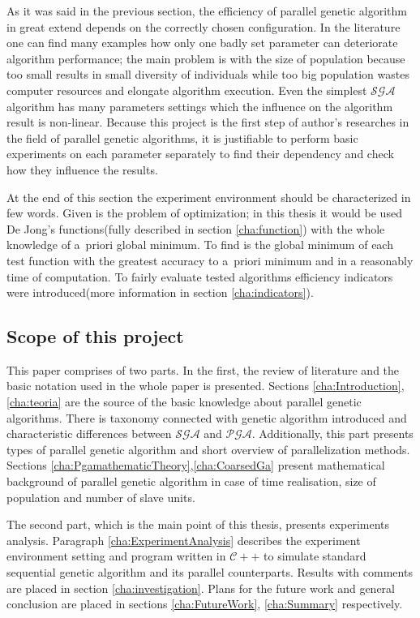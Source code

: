 As it was said in the previous section, the efficiency of parallel genetic
algorithm in great extend depends on the correctly chosen configuration. In the
literature one can find many examples how only one badly set parameter can
deteriorate algorithm performance; the main problem is with the size of
population because too small results in small diversity of individuals while too
big population wastes computer resources and elongate algorithm execution. Even
the simplest $\mathcal{SGA}$ algorithm has many parameters settings which the
influence on the algorithm result is non-linear. Because this project is the
first step of author's researches in the field of parallel genetic algorithms, it
is justifiable to perform basic experiments on each parameter separately to find
their dependency and check how they influence the results. 

At the end of this section the experiment environment should be characterized in
few words. Given is the problem of optimization; in this thesis it would be used
De Jong's functions(fully described in section \ref{cha:function}) with the
whole knowledge of a~priori global minimum. To find is the global minimum of
each test function with the greatest accuracy to a~priori minimum and in a reasonably
time of computation. To fairly evaluate tested algorithms efficiency
indicators were introduced(more information in section \ref{cha:indicators}).

\subsection{Scope of this project}
This paper comprises of two parts. In the first, the review of
literature and the basic notation used in the whole paper is presented. Sections
\ref{cha:Introduction}, \ref{cha:teoria} are the source of the basic
knowledge about parallel genetic algorithms. There is taxonomy connected with
genetic algorithm introduced and characteristic differences
between $\mathcal{SGA}$ and $\mathcal{PGA}$. Additionally, this part presents
types of parallel genetic algorithm and short overview of parallelization
methods. Sections \ref{cha:PgamathematicTheory},\ref{cha:CoarsedGa} present mathematical background 
of parallel genetic algorithm in case of time realisation, size of population
and number of slave units.


The second part, which is the main point of this thesis, presents experiments analysis.
Paragraph \ref{cha:ExperimentAnalysis} describes the experiment environment
setting and program written in $\mathcal{C++}$ to simulate standard sequential genetic
algorithm and its parallel counterparts. Results with comments are placed in
section \ref{cha:investigation}. Plans for the future work and general
conclusion are placed in sections \ref{cha:FutureWork}, \ref{cha:Summary}
respectively. 

